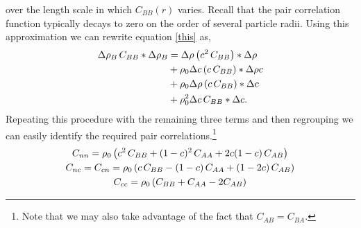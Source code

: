 over the length scale in which $C_{BB}(r)$ varies. Recall that the pair
correlation function typically decays to zero on the order of several particle
radii. Using this approximation we can rewrite equation \ref{this} as,
%
\begin{align}
  \Delta \rho_B \, C_{BB} \ast \Delta \rho_B &= \Delta \rho \left(c^2 \,C_{BB}\right) \ast \Delta \rho \nonumber\\
                             &+ \rho_0 \Delta c \left(c \,C_{BB}\right) \ast \Delta \rho c \\
                             &+ \rho_0 \Delta \rho \left(c \,C_{BB}\right) \ast \Delta c \nonumber\\
                             &+ \rho_0^2 \Delta c \,C_{BB} \ast \Delta c. \nonumber
\end{align}
%
Repeating this procedure with the remaining three terms and then regrouping we
can easily identify the required pair correlations.\footnote{Note that we may
also take advantage of the fact that $C_{AB} = C_{BA}$.}
%
\begin{gather}
  C_{nn} = \rho_0 \left( c^2 \, C_{BB} + (1 - c)^2 \, C_{AA} + 2c(1-c)\,C_{AB}\right) \\
  C_{nc} = C_{cn} = \rho_0 \left( c\,C_{BB} - (1-c)\,C_{AA} + (1 - 2c) \, C_{AB} \right) \\
  C_{cc} = \rho_0 \left( C_{BB} + C_{AA} - 2 C_{AB} \right)
\end{gather}

